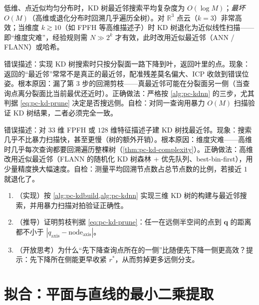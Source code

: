 \begin{theorem}[KD 树搜索复杂度]\label{thm:pc-kd-complexity}
低维、点近似均匀分布时，KD 树最近邻搜索平均复杂度为 $O(\log M)$；\emph{最坏} $O(M)$（高维或退化分布时回溯几乎遍历全树）。对 $\mathbb{R}^3$ 点云（$k=3$）非常高效；当维度 $k\gtrsim10$（如 FPFH 等高维描述子）时 KD 树退化为近似线性扫描——即“维度灾难”，经验规则需 $N\gg2^k$ 才有效，此时改用近似最近邻（ANN / FLANN）或哈希。
\end{theorem}

\begin{pitfall}
错误描述：实现 KD 树搜索时只按分裂面一路下降到叶，返回叶里的点。现象：返回的“最近邻”常常不是真正的最近邻，配准残差莫名偏大、ICP 收敛到错误位姿。根本原因：漏了第 3 步的回溯剪枝——真最近邻可能在分裂面另一侧（当查询点离分裂面比当前最优还近时）。正确做法：严格按 \cref{alg:pc-kdnn} 的三步，尤其判据 \cref{eq:pc-kd-prune} 决定是否搜远侧。自检：对同一查询用暴力 $O(M)$ 扫描验证 KD 树结果，二者必须完全一致。
\end{pitfall}

\begin{pitfall}
错误描述：对 $33$ 维 FPFH 或 $128$ 维特征描述子建 KD 树找最近邻。现象：搜索几乎不比暴力扫描快，甚至更慢（树的额外开销）。根本原因：维度灾难——高维时几乎每次查询都要回溯遍历整棵树（\cref{thm:pc-kd-complexity}）。正确做法：高维改用近似最近邻（FLANN 的随机化 KD 树森林 + 优先队列、best-bin-first），用少量精度换大幅速度。自检：测量平均回溯节点数占总节点数的比例，若接近 $1$ 就退化了。
\end{pitfall}

\begin{practice}
\begin{enumerate}
  \item （实现）按 \cref{alg:pc-kdbuild,alg:pc-kdnn} 实现三维 KD 树的构建与最近邻搜索，并用暴力扫描对拍验证正确性。
  \item （推导）证明剪枝判据 \cref{eq:pc-kd-prune}：任一在远侧半空间的点到 $\mathbf{q}$ 的距离都不小于 $|q_{\text{axis}}-\text{node}_{\text{axis}}|$。
  \item （开放思考）为什么“先下降查询点所在的一侧”比随便先下降一侧更高效？提示：先下降所在侧能更早收紧 $r^\ast$，从而剪掉更多远侧分支。
\end{enumerate}
\end{practice}

\section{拟合：平面与直线的最小二乘提取}
\label{sec:pc-fit}

